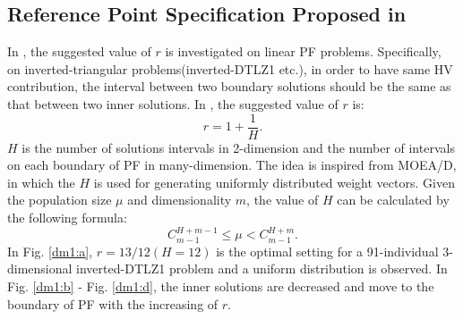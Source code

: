 \documentclass[conference]{IEEEtran}
\begin{document}
\subsection{Reference Point Specification Proposed in \cite{hisao:RPhowtoSpecify}}
In \cite{hisao:RPexplanation, hisao:RPhowtoSpecify, hisao:RPspecify}, the suggested value of $r$ is investigated 
on linear PF problems. 
Specifically, on inverted-triangular problems(inverted-DTLZ1\cite{hisao:RPexplanation} etc.), 
in order to have same HV contribution, 
the interval between two boundary solutions should be the same as that between two inner solutions.
In \cite{hisao:RPhowtoSpecify}, the suggested value of $r$ is:
\begin{equation}\label{eod}
  r=1+\frac{1}{H}.
\end{equation}
$H$ is the number of solutions intervals in 2-dimension 
and the number of intervals on each boundary of PF in many-dimension. 
The idea is inspired from MOEA/D\cite{MOEAD}, in which the $H$ is used for 
generating uniformly distributed weight vectors\cite{hisao:dynamic}. 
Given the population size $\mu$ and dimensionality $m$, the value of $H$ can be calculated by the following formula:
\begin{equation}
  C^{H+m-1}_{m-1} \leq \mu < C^{H+m}_{m-1}.
\end{equation}
In Fig. \ref{dm1:a}, $r=13/12(H=12)$ is the optimal setting for a 91-individual 3-dimensional 
inverted-DTLZ1 problem and a uniform distribution is observed. 
In Fig. \ref{dm1:b} - Fig. \ref{dm1:d}, the inner solutions are decreased and move to 
the boundary of PF with the increasing of $r$. 
\end{document}
